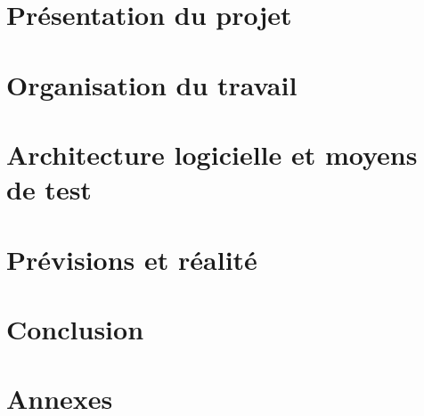 \documentclass[a4paper,11pt]{article}
\begin{document}
\pagestyle{plain}


\selectfont

\makeTitlePage %

\clearpage
{}\selectfont

\begin{Large}
\tableofcontents
\end{Large}

\clearpage

\section{Présentation du projet}


\section{Organisation du travail}


\section{Architecture logicielle et moyens de test}


\section{Prévisions et réalité}


\section{Conclusion}


\appendix
\clearpage
\section{Annexes}


\makeAbstractPage
\pagestyle{empty}
\end{document}
